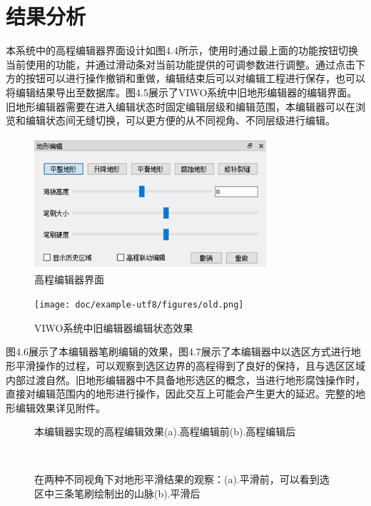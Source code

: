 \section{结果分析}
本系统中的高程编辑器界面设计如图4.4所示，使用时通过最上面的功能按钮切换当前使用的功能，并通过滑动条对当前功能提供的可调参数进行调整。通过点击下方的按钮可以进行操作撤销和重做，编辑结束后可以对编辑工程进行保存，也可以将编辑结果导出至数据库。图4.5展示了VIWO系统中旧地形编辑器的编辑界面。旧地形编辑器需要在进入编辑状态时固定编辑层级和编辑范围，本编辑器可以在浏览和编辑状态间无缝切换，可以更方便的从不同视角、不同层级进行编辑。
\begin{figure}[htbp]
    \centering
    \includegraphics[height=4.9cm,width=8.6cm]{figures/demInterface.png}
  \caption{高程编辑器界面}
  \end{figure}
  
  \begin{figure}[h]
\centering
\texttt{[image: doc/example-utf8/figures/old.png]}
\caption{VIWO系统中旧编辑器编辑状态效果}
\end{figure}
图4.6展示了本编辑器笔刷编辑的效果，图4.7展示了本编辑器中以选区方式进行地形平滑操作的过程，可以观察到选区边界的高程得到了良好的保持，且与选区区域内部过渡自然。旧地形编辑器中不具备地形选区的概念，当进行地形腐蚀操作时，直接对编辑范围内的地形进行操作，因此交互上可能会产生更大的延迟。完整的地形编辑效果详见附件。\par
\begin{figure}[h]
\centering
{}
\caption{本编辑器实现的高程编辑效果(a).高程编辑前(b).高程编辑后}
\end{figure}

\begin{figure}[htbp]
\centering
{}
\\

\caption{在两种不同视角下对地形平滑结果的观察：(a).平滑前，可以看到选区中三条笔刷绘制出的山脉(b).平滑后}
\end{figure}

